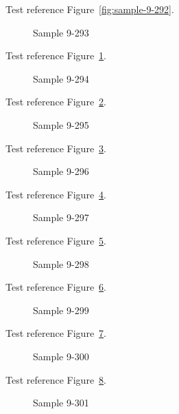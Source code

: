 Test reference Figure~\ref{fig:sample-9-292}.

\begin{figure}[tbhp]
\caption{Sample 9-293}
\label{fig:sample-9-293}
\end{figure}

Test reference Figure~\ref{fig:sample-9-293}.

\begin{figure}[tbhp]
\caption{Sample 9-294}
\label{fig:sample-9-294}
\end{figure}

Test reference Figure~\ref{fig:sample-9-294}.

\begin{figure}[tbhp]
\caption{Sample 9-295}
\label{fig:sample-9-295}
\end{figure}

Test reference Figure~\ref{fig:sample-9-295}.

\begin{figure}[tbhp]
\caption{Sample 9-296}
\label{fig:sample-9-296}
\end{figure}

Test reference Figure~\ref{fig:sample-9-296}.

\begin{figure}[tbhp]
\caption{Sample 9-297}
\label{fig:sample-9-297}
\end{figure}

Test reference Figure~\ref{fig:sample-9-297}.

\begin{figure}[tbhp]
\caption{Sample 9-298}
\label{fig:sample-9-298}
\end{figure}

Test reference Figure~\ref{fig:sample-9-298}.

\begin{figure}[tbhp]
\caption{Sample 9-299}
\label{fig:sample-9-299}
\end{figure}

Test reference Figure~\ref{fig:sample-9-299}.

\begin{figure}[tbhp]
\caption{Sample 9-300}
\label{fig:sample-9-300}
\end{figure}

Test reference Figure~\ref{fig:sample-9-300}.

\begin{figure}[tbhp]
\caption{Sample 9-301}
\label{fig:sample-9-301}
\end{figure}

